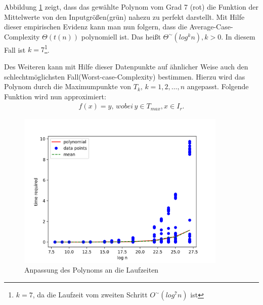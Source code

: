 \documentclass[12pt,oneside]{article}
\theoremstyle{remark}
\theoremstyle{definition}
\begin{document}
Abbildung \ref{runtime-find_r} zeigt, dass das gewählte Polynom vom Grad 7 (rot) die Funktion der Mittelwerte von den Inputgrößen(grün) nahezu zu perfekt darstellt. Mit Hilfe dieser empirischen Evidenz kann man nun folgern, dass die Average-Case-Complexity $\Theta(t(n))$ polynomiell ist. Das heißt $\Theta^{\sim}(log^k  n), k > 0$. In diesem Fall ist $k = 7$\footnote{$k =7$, da die Laufzeit vom zweiten Schritt $O^{\sim}(log^7 n)$ ist}.


Des Weiteren kann mit Hilfe dieser Datenpunkte auf ähnlicher Weise auch den schlechtmöglichsten Fall(Worst-case-Complexity) bestimmen. Hierzu wird das Polynom durch die Maximumpunkte von $T_{k}, \, k = 1,2, \dots, n$ angepasst.
Folgende Funktion wird nun approximiert: 
\begin{align*}
    f(x) = y, \, wobei \,y \in T_{max} , x \in I_{r}.
\end{align*}

\begin{figure}[h]
\includegraphics[width=10cm]{plots/runtime_find_r.png}
\centering
\caption{Anpassung des Polynoms an die Laufzeiten}
\label{runtime-find_r}
\end{figure}
\end{document}
